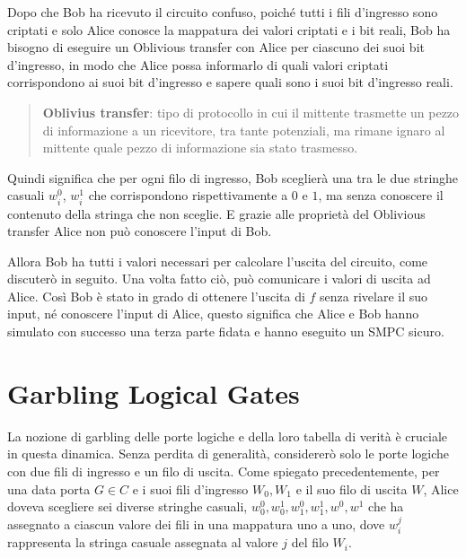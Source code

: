 \documentclass[
  italian,
]{book}
\begin{document}
Dopo che Bob ha ricevuto il circuito confuso, poiché tutti i fili d'ingresso sono criptati e solo Alice conosce la mappatura dei valori criptati e i bit reali, Bob ha bisogno di eseguire un Oblivious transfer con Alice per ciascuno dei suoi bit d'ingresso, in modo che Alice possa informarlo di quali valori criptati corrispondono ai suoi bit d'ingresso e sapere quali sono i suoi bit d'ingresso reali.

\begin{quote}
\textbf{Oblivius transfer}: tipo di protocollo in cui il mittente trasmette un pezzo di informazione a un ricevitore, tra tante potenziali, ma rimane ignaro al mittente quale pezzo di informazione sia stato trasmesso.
\end{quote}

Quindi significa che per ogni filo di ingresso, Bob sceglierà una tra le due stringhe casuali \(w^{0}_{i}\), \(w^{1}_{i}\) che corrispondono rispettivamente a \(0\) e \(1\), ma senza conoscere il contenuto della stringa che non sceglie. E grazie alle proprietà del Oblivious transfer Alice non può conoscere l'input di Bob.

Allora Bob ha tutti i valori necessari per calcolare l'uscita del circuito, come discuterò in seguito. Una volta fatto ciò, può comunicare i valori di uscita ad Alice. Così Bob è stato in grado di ottenere l'uscita di \(f\) senza rivelare il suo input, né conoscere l'input di Alice, questo significa che Alice e Bob hanno simulato con successo una terza parte fidata e hanno eseguito un SMPC sicuro.

\newpage

\hypertarget{garbling-logical-gates}{%
\section{Garbling Logical Gates}\label{garbling-logical-gates}}

La nozione di garbling delle porte logiche e della loro tabella di verità è cruciale in questa dinamica. Senza perdita di generalità, considererò solo le porte logiche con due fili di ingresso e un filo di uscita. Come spiegato precedentemente, per una data porta \(G \in C\) e i suoi fili d'ingresso \(W_0, W_1\) e il suo filo di uscita \(W\), Alice doveva scegliere sei diverse stringhe casuali, \(w^{0}_{0}, w^{1}_{0}, w^{0}_{1}, w^{1}_{1}, w^0, w^1\) che ha assegnato a ciascun valore dei fili in una mappatura uno a uno, dove \(w^{j}_{i}\) rappresenta la stringa casuale assegnata al valore \(j\) del filo \(W_i\).
\end{document}
